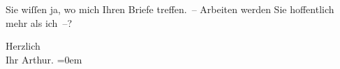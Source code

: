 \pstart
           Sie wiſſen ja, wo mich Ihren Briefe treffen. – Arbeiten werden Sie hoffentlich mehr
               als ich –?\pend
           
\pstart
           Herzlich{\\[\baselineskip]}Ihr \spacefill\mbox{Arthur.}\pend
           \leftskip=0em{}\endnumbering{}  \newcommand{\dateiname}{L00563}\newcommand{\titel}{Arthur Schnitzler an Richard Beer-Hofmann, 15. 7. 1896}\newcommand{\editorInnen}{Martin Anton Müller und Gerd-Hermann Susen}
